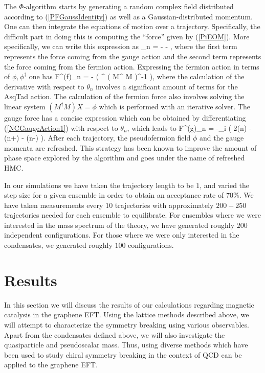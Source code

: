 \documentclass[aps,prd,twocolumn,showpacs,superscriptaddress,groupedaddress]{revtex4}  %
\begin{document}
The $\Phi$-algorithm starts by generating a random complex field distributed according to (\ref{PFGaussIdentity}) as well as a Gaussian-distributed momentum. One can then integrate the equations of motion over a trajectory. Specifically, the difficult part in doing this is computing the ``force'' given by (\ref{PiEOM}).
More specifically, we can write this expression as 
\beq
\dot{\pi}_n = - - , 
\eeq
where the first term represents the force coming from the gauge action and the second term represents the force coming from the fermion action. Expressing the fermion action in terms of $\phi, \phi^{\dagger}$ one has
\beq
\label{FermionForce}
F^{(f)}_n = -  \left( \phi^{\dagger} \left( M^{\dagger} M \right)^{-1}  \phi \right), 
\eeq
where the calculation of the derivative with respect to $\theta_n$ involves a significant amount of terms for the AsqTad action. The calculation of the fermion force also involves solving the linear system $\left( M^{\dagger}M \right) X = \phi$ which is performed with an iterative solver.
The gauge force has a concise expression which can be obtained by differentiating (\ref{NCGaugeAction1}) with respect to $\theta_n$, which leads to
\beq
\label{GaugeForce}
F^{(g)}_n = -\beta \sum_i \left( 2\theta(n) - \theta(n+) - \theta(n-) \right).
\eeq
After each trajectory, the pseudofermion field $\phi$ and the gauge momenta are refreshed. This strategy has been known to improve the amount of phase space explored by the algorithm and goes
under the name of refreshed HMC.

In our simulations we have taken the trajectory length to be $1$, and varied the step size for a given ensemble in order to obtain an acceptance rate of $70 \%$. We have
taken measurements every $10$ trajectories with approximately $200-250$ trajectories needed for each ensemble to equilibrate. For ensembles where we were interested in the mass spectrum of the theory,
we have generated roughly $200$ independent configurations. For those where we were only interested in the condensates, we generated roughly $100$ configurations.
\section{\label{sec:Results}Results}

In this section we will discuss the results of our calculations regarding magnetic catalysis in the graphene EFT. Using the lattice methods described above, we will attempt to characterize the symmetry breaking using various observables.
Apart from the condensates defined above, we will also investigate the quasiparticle and pseudoscalar mass. Thus, using diverse methods which have been used to study chiral symmetry breaking in the
context of QCD can be applied to the graphene EFT.
\end{document}
